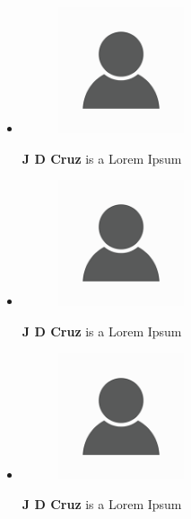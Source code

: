 
\begin{vita}

\begin{itemize}
    \item 
    
    \begin{figure}[ht]
        \centering
    	\includegraphics[width=0.35\textwidth]{figures/person-icon.png}
    \end{figure}
    
    \textbf{J D Cruz} is a  Lorem Ipsum
    
    \item 
    
    \begin{figure}[ht]
        \centering
    	\includegraphics[width=0.35\textwidth]{figures/person-icon.png}
    \end{figure}
    
    \textbf{J D Cruz} is a  Lorem Ipsum
    
    \item 
    
    \begin{figure}[ht]
        \centering
    	\includegraphics[width=0.35\textwidth]{figures/person-icon.png}
    \end{figure}
    
    \textbf{J D Cruz} is a  Lorem Ipsum
\end{itemize}

\end{vita}